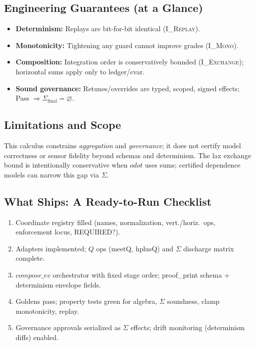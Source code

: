 \documentclass[11pt]{article}
\theoremstyle{plain}
\theoremstyle{definition}
\theoremstyle{remark}
\def\Q{Q}%
\def\Sig{\Sigma}%
\def\composeev{compose\_ev}%
\def\hplus{odot}%
\def\code#1{#1}%
\DeclareRobustCommand{\Q}{\texorpdfstring{\ensuremath{\mathcal{Q}}}{Q}}     %
\DeclareRobustCommand{\Sig}{\texorpdfstring{\ensuremath{\Sigma}}{\Sigma}}   %
\DeclareMathOperator{\composeevOp}{compose\_ev}
\DeclareRobustCommand{\composeev}{\texorpdfstring{\ensuremath{\composeevOp}}{compose\_ev}}
\newcommand{\hplus}{\odot}                     %
\newcommand{\code}[1]{\texttt{\textup{#1}}}    %
\newcommand{\ledger}{\code{ledger}}
\newcommand{\cvar}{\code{cvar}}
\newcommand{\IMono}{\textsc{I\_Mono}}
\newcommand{\IExchange}{\textsc{I\_Exchange}}
\newcommand{\IReplay}{\textsc{I\_Replay}}
\def\Q{Q}%
\def\Sig{\Sigma}%
\def\composeev{compose\_ev}%
\def\hplus{odot}%
\def\code#1{#1}%
\begin{document}
\subsection{Engineering Guarantees (at a Glance)}
\begin{itemize}[leftmargin=1.6em]
  \item \textbf{Determinism:} Replays are bit-for-bit identical (\IReplay).
  \item \textbf{Monotonicity:} Tightening any guard cannot improve grades (\IMono).
  \item \textbf{Composition:} Integration order is conservatively bounded (\IExchange); horizontal sums apply only to \ledger/\cvar.
  \item \textbf{Sound governance:} Retunes/overrides are typed, scoped, signed effects; Pass \(\Rightarrow \Sigma_{\mathrm{final}}=\varnothing\).
\end{itemize}

\subsection{Limitations and Scope}
This calculus constrains \emph{aggregation} and \emph{governance}; it does not certify model correctness or sensor fidelity beyond schemas and determinism. The lax exchange bound is intentionally conservative when \(\hplus\) uses sums; certified dependence models can narrow this gap via \(\Sig\).

\subsection{What Ships: A Ready-to-Run Checklist}
\begin{enumerate}[leftmargin=2em,label=(S\arabic*)]
  \item Coordinate registry filled (names, normalization, vert./horiz.\ ops, enforcement locus, REQUIRED?).
  \item Adapters implemented; \(\Q\) ops (\code{meetQ}, \code{hplusQ}) and \(\Sig\) discharge matrix complete.
  \item $\composeev$ orchestrator with fixed stage order; \code{proof\_print} schema + determinism envelope fields.
  \item Goldens pass; property tests green for algebra, \(\Sig\) soundness, clamp monotonicity, replay.
  \item Governance approvals serialized as \(\Sig\) effects; drift monitoring (determinism diffs) enabled.
\end{enumerate}
\end{document}
